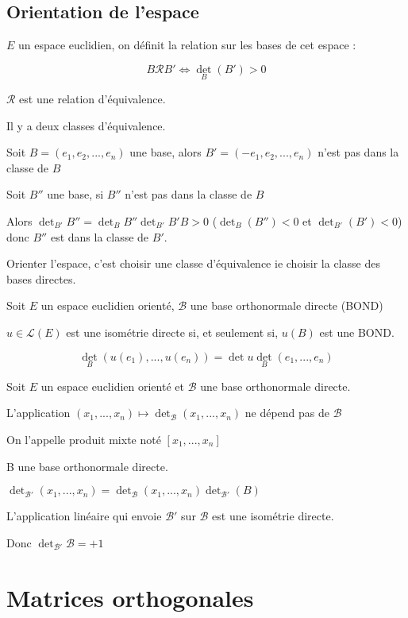 \documentclass[a4paper,12pt]{book}
\newcommand{\Def}[2]{\begin{tcolorbox}[sharp corners, colback=white,colframe=blue!90!black!75, title=Définition : #1]#2\end{tcolorbox}}
\newcommand{\Prop}[2]{\begin{tcolorbox}[sharp corners, colback=white,colframe=red!90!black!75, title=Proposition : #1]#2\end{tcolorbox}}
\newcommand{\Pre}[1]{\begin{tcolorbox}[sharp corners, colback=white,colframe=green!60!green!30!black!75, title=Preuve]#1\end{tcolorbox}}
\begin{document}
\subsection{Orientation de l'espace}
\Def{}{$E$ un espace euclidien, on définit la relation sur les bases de cet espace :
\par $$B\mathcal{R}B'\Leftrightarrow \det_B(B') > 0$$
\par $\mathcal{R}$ est une relation d'équivalence.
\par Il y a deux classes d'équivalence.}
\Pre{Soit $B=(e_1,e_2,..., e_n)$ une base, alors $B'=(-e_1, e_2,..., e_n)$ n'est pas dans la classe de $B$
\par Soit $B''$ une base, si $B''$ n'est pas dans la classe de $B$
\par Alors $\det_{B'}B'' = \det_{B}B'' \det_{B'}{B'}B>0$ ($\det_B(B'')<0$ et $\det_{B'}(B')<0$) donc $B''$ est dans la classe de $B'$.}
Orienter l'espace, c'est choisir une classe d'équivalence ie choisir la classe des bases directes.

\Prop{}{Soit $E$ un espace euclidien orienté, $\mathcal{B}$ une base orthonormale directe (BOND)
\par $u\in\mathcal{L}(E)$ est une isométrie directe si, et seulement si, $u(B)$ est une BOND.
\par $$ \det_B(u(e_1),..., u(e_n)) = \det u\det_B(e_1, ..., e_n)$$}
\Def{Produit mixte}{Soit $E$ un espace euclidien orienté et $\mathcal{B}$ une base orthonormale directe.
\par L'application $(x_1,..., x_n)\mapsto \det_\mathcal{B}(x_1,..., x_n)$ ne dépend pas de $\mathcal{B}$
\par On l'appelle produit mixte noté $[x_1, ..., x_n]$}
\Pre{B une base orthonormale directe.
\par $\det_{\mathcal{B}'}(x_1,..., x_n) = \det_\mathcal{B}(x_1,..., x_n)\det_{\mathcal{B}'}(B)$
\par L'application linéaire qui envoie $\mathcal{B}'$ sur $\mathcal{B}$ est une isométrie directe.
\par Donc $\det_{\mathcal{B}'}\mathcal{B}=+1$}


\section{Matrices orthogonales}
\end{document}
